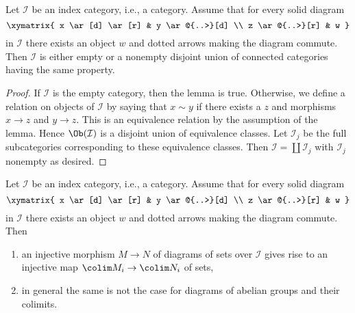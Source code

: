 \begin{lemma}
\label{lemma-split-into-connected}
Let $\mathcal{I}$ be an index category, i.e., a category. Assume
that for every solid diagram
$$
\xymatrix{
x \ar[d] \ar[r] & y \ar@{..>}[d] \\
z \ar@{..>}[r] & w
}
$$
in $\mathcal{I}$ there exists an object $w$ and dotted arrows
making the diagram commute. Then $\mathcal{I}$ is either empty
or a nonempty disjoint union of connected categories having
the same property.
\end{lemma}

\begin{proof}
If $\mathcal{I}$ is the empty category, then the lemma is true.
Otherwise, we define a relation on objects of $\mathcal{I}$ by
saying that $x \sim y$ if there exists a $z$ and
morphisms $x \to z$ and $y \to z$. This is an equivalence
relation by the assumption of the lemma. Hence $\Ob(\mathcal{I})$
is a disjoint union of equivalence classes. Let $\mathcal{I}_j$
be the full subcategories corresponding to these equivalence classes.
Then $\mathcal{I} = \coprod \mathcal{I}_j$ with $\mathcal{I}_j$
nonempty as desired.
\end{proof}

\begin{lemma}
\label{lemma-preserve-injective-maps}
Let $\mathcal{I}$ be an index category, i.e., a category. Assume
that for every solid diagram
$$
\xymatrix{
x \ar[d] \ar[r] & y \ar@{..>}[d] \\
z \ar@{..>}[r] & w
}
$$
in $\mathcal{I}$ there exists an object $w$ and dotted arrows
making the diagram commute. Then
\begin{enumerate}
\item an injective morphism $M \to N$ of diagrams of sets over
$\mathcal{I}$ gives rise to an injective map $\colim M_i \to \colim N_i$
of sets,
\item in general the same is not the case for diagrams of abelian
groups and their colimits.
\end{enumerate}
\end{lemma}

